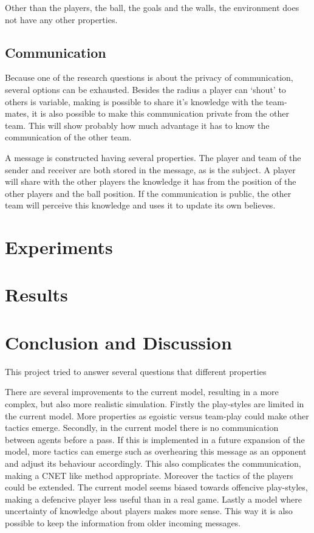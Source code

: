 \documentclass{article}
\begin{document}
Other than the players, the ball, the goals and the walls, the environment does not have any other properties.

\subsection{Communication}
Because one of the research questions is about the privacy of communication, several options can be exhausted.
Besides the radius a player can `shout' to others is variable, making is possible to share it's knowledge with the team-mates, it is also possible to make this communication private from the other team.
This will show probably how much advantage it has to know the communication of the other team.

A message is constructed having several properties.
The player and team of the sender and receiver are both stored in the message, as is the subject.
A player will share with the other players the knowledge it has from the position of the other players and the ball position.
If the communication is public, the other team will perceive this knowledge and uses it to update its own believes.


\section{Experiments}

\section{Results}

\section{Conclusion and Discussion}
This project tried to answer several questions that different properties 

There are several improvements to the current model, resulting in a more complex, but also more realistic simulation.
Firstly the play-styles are limited in the current model.
More properties as egoistic versus team-play could make other tactics emerge. 
Secondly, in the current model there is no communication between agents before a pass.
If this is implemented in a future expansion of the model, more tactics can emerge such as overhearing this message as an opponent and adjust its behaviour accordingly.
This also complicates the communication, making a CNET like method appropriate.
Moreover the tactics of the players could be extended. The current model seems biased towards offencive play-styles, making a defencive player less useful than in a real game.
Lastly a model where uncertainty of knowledge about players makes more sense. This way it is also possible to keep the information from older incoming messages.
\end{document}
